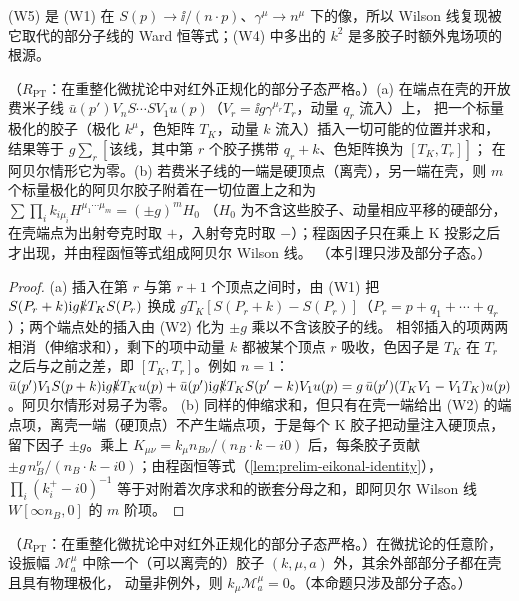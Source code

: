 (W5) 是 (W1) 在 $S(p)\to\ii/(n\cdot p)$、$\gamma^\mu\to n^\mu$ 下的像，所以 Wilson 线复现被它取代的部分子线的 Ward 恒等式；(W4) 中多出的 $k^2$ 是多胶子时额外鬼场项的根源。

\begin{lemma}\label{lem:method-ward-abelian}
（$R_{\mathrm{PT}}$：在重整化微扰论中对红外正规化的部分子态严格。）(a) 在端点在壳的开放费米子线 $\bar u(p')V_nS\cdots SV_1u(p)$（$V_r=\ii g\gamma^{\mu_r}T_r$，动量 $q_r$ 流入）上，
把一个标量极化的胶子（极化 $k^\mu$，色矩阵 $T_K$，动量 $k$ 流入）插入一切可能的位置并求和，结果等于 $g\sum_r[\text{该线，其中第 }r\text{ 个胶子携带 }q_r+k\text{、色矩阵换为 }[T_K,T_r]]$；
在阿贝尔情形它为零。(b) 若费米子线的一端是硬顶点（离壳），另一端在壳，则 $m$ 个标量极化的阿贝尔胶子附着在一切位置上之和为 $\sum\prod_ik_{i\mu_i}H^{\mu_1\cdots\mu_m}=(\pm g)^mH_0$
（$H_0$ 为不含这些胶子、动量相应平移的硬部分，在壳端点为出射夸克时取 $+$，入射夸克时取 $-$）；程函因子只在乘上 K 投影之后才出现，并由程函恒等式组成阿贝尔 Wilson 线。
（本引理只涉及部分子态。）
\end{lemma}

\begin{proof}
(a) 插入在第 $r$ 与第 $r+1$ 个顶点之间时，由 (W1) 把 $S(P_r+k)\mathrm{i} g\slashed{k}T_KS(P_r)$ 换成 $gT_K[S(P_r+k)-S(P_r)]$（$P_r=p+q_1+\cdots+q_r$）；两个端点处的插入由 (W2) 化为 $\pm g$ 乘以不含该胶子的线。
相邻插入的项两两相消（伸缩求和），剩下的项中动量 $k$ 都被某个顶点 $r$ 吸收，色因子是 $T_K$ 在 $T_r$ 之后与之前之差，即 $[T_K,T_r]$。例如 $n=1$：
$\bar u(p')V_1S(p+k)\mathrm{i} g\slashed{k}T_Ku(p)+\bar u(p')\mathrm{i} g\slashed{k}T_KS(p'-k)V_1u(p)=g\,\bar u(p')(T_KV_1-V_1T_K)u(p)$。阿贝尔情形对易子为零。
(b) 同样的伸缩求和，但只有在壳一端给出 (W2) 的端点项，离壳一端（硬顶点）不产生端点项，于是每个 K 胶子把动量注入硬顶点，留下因子 $\pm g$。乘上
$K_{\mu\nu}=k_\mu n_{B\nu}/(n_B\cdot k-i0)$ 后，每条胶子贡献 $\pm g\,n_B^\nu/(n_B\cdot k-i0)$；由程函恒等式（\cref{lem:prelim-eikonal-identity}），
$\prod_i(k_i^+-i0)^{-1}$ 等于对附着次序求和的嵌套分母之和，即阿贝尔 Wilson 线 $W[\infty n_B,0]$ 的 $m$ 阶项。
\end{proof}

\begin{proposition}\label{prop:method-ward-one}
（$R_{\mathrm{PT}}$：在重整化微扰论中对红外正规化的部分子态严格。）在微扰论的任意阶，设振幅 $\mathcal M^\mu_a$ 中除一个（可以离壳的）胶子 $(k,\mu,a)$ 外，其余外部部分子都在壳且具有物理极化，
动量非例外，则 $k_\mu\mathcal M^\mu_a=0$。（本命题只涉及部分子态。）
\end{proposition}

